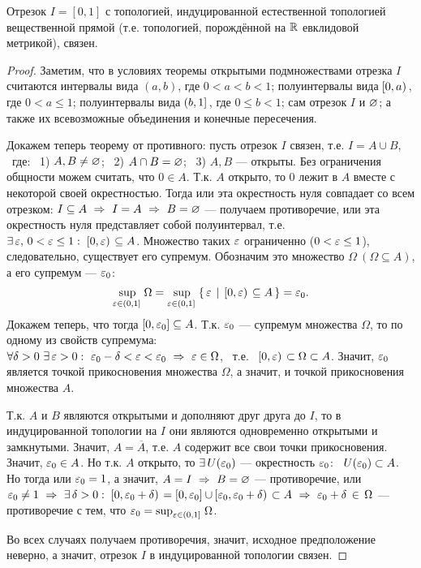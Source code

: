 \begin{theorem} %
    Отрезок $I = [0, 1]$ с топологией, индуцированной естественной топологией вещественной прямой (т.е. топологией, порождённой на $\mathbb{R}$ евклидовой метрикой), связен.
\end{theorem}
\begin{proof}
    Заметим, что в условиях теоремы открытыми подмножествами отрезка $I$ считаются интервалы вида $(a, b)$, где $0 < a < b < 1$; полуинтервалы вида $\!\left.\left[0, a\right)\right.$, где $0 < a \leq 1$; полуинтервалы вида $\!\left.\left(b, 1\right]\right.$, где $0 \leq b < 1$; сам отрезок $I$ и $\varnothing$; а также их всевозможные объединения и конечные пересечения.

    Докажем теперь теорему от противного: пусть отрезок $I$ связен, т.е. $I = A \cup B$, \ где: \ 1) $A, B \neq \varnothing$; \ 2) $A \cap B = \varnothing$; \ 3) $A, B$ --- открыты.
    Без ограничения общности можем считать, что $0 \in A$. Т.к. $A$ открыто, то $0$ лежит в $A$ вместе с некоторой своей окрестностью. Тогда или эта окрестность нуля совпадает со всем отрезком: $I \subseteq A  \ \Rightarrow \ I = A \ \Rightarrow \ B = \es$ --- получаем противоречие, или эта окрестность нуля представляет собой полуинтервал, т.е. $\exists \, \varepsilon, \, 0 < \varepsilon \leq 1 : \ \!\left.\left[0, \varepsilon\right)\right. \subseteq A$.
    Множество таких $\varepsilon$ ограниченно ($0 < \varepsilon  \leq 1$), следовательно, существует его супремум. Обозначим это множество $\Omega \ (\Omega \subseteq A)$, а его супремум --- $\varepsilon_0$:
    \[
        \sup_{\varepsilon \in \!\left.\left(0, 1\right]\right.}{\Omega} = \sup_{\varepsilon \in \!\left.\left(0, 1\right]\right.}{ \left\{\, \varepsilon \, \mid \, \!\left.\left[0, \varepsilon\right)\right. \subseteq A \,\right\} } = \varepsilon_0.
    \]
    Докажем теперь, что тогда $\left[0, \varepsilon_0\right] \subseteq A$. Т.к. $\varepsilon_0$ --- супремум множества $\Omega$, то по одному из свойств супремума: \\
    $\forall \delta > 0 \ \exists \, \varepsilon > 0: \ \varepsilon_0 - \delta < \varepsilon < \varepsilon_0 \ \Rightarrow \ \varepsilon \in \Omega$, \, т.е. \, $\!\left.\left[0, \varepsilon\right)\right. \subset \Omega \subset A$. Значит, $\varepsilon_0$ является точкой прикосновения множества $\Omega$, а значит, и точкой прикосновения множества $A$.
    
    Т.к. $A$ и $B$ являются открытыми и дополняют друг друга до $I$, то в индуцированной топологии на $I$ они являются одновременно открытыми и замкнутыми. Значит, $A = \overline{A}$, т.е. $A$ содержит все свои точки прикосновения. Значит, $\varepsilon_0 \in A$. Но т.к. $A$ открыто, то $\exists \, U(\varepsilon_0)$ --- окрестность $\varepsilon_0$: \ $U(\varepsilon_0) \subset A$.
    Но тогда или $\varepsilon_0 = 1$, а значит, $A = I \ \Rightarrow \ B = \varnothing$ --- противоречие, или $\veps_0 \neq 1 \ \Rightarrow \ \exists \, \delta > 0: \ \lseg{0, \veps_0 + \delta} = \sqbr{0, \veps_0} \cup \lseg{\veps_0, \veps_0 + \delta} \subset A \ \Rightarrow \ \veps_0 + \delta \, \in \, \Omega$ --- противоречие с тем, что $\varepsilon_0 = \sup_{\varepsilon \in \!\left.\left(0, 1\right]\right.}{\Omega}$.

    Во всех случаях получаем противоречия, значит, исходное предположение неверно, а значит, отрезок $I$ в индуцированной топологии связен.
\end{proof}

